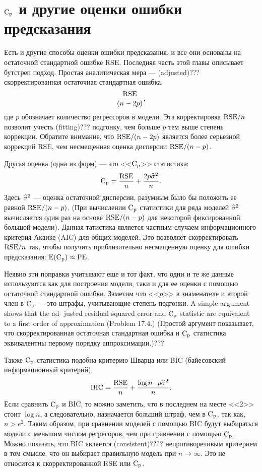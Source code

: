 \section{$\text{C}_{\text{p}}$ и другие оценки ошибки предсказания}
Есть и другие способы оценки ошибки предсказания, и все они основаны на остаточной стандартной ошибке RSE. Последняя часть этой главы описывает бутстреп подход. Простая аналитическая мера --- (adjusted)??? скорректированная остаточная стандартная ошибка:
\begin{equation}
\frac{\text{RSE}}{(n - 2p)},
\end{equation}
где $p$ обозначает количество регрессоров в модели. 
Эта корректировка $\text{RSE} / n$ позволит учесть (fitting)??? подгонку, чем больше $p$ тем выше степень коррекции. Обратите внимание, что $\text{RSE} / (n-2p)$ является более серьезной коррекций RSE, чем несмещенная оценка дисперсии $\text{RSE} / (n-p)$.

Другая оценка (одна из форм) --- это <<$\text{C}_{\text{p}}$>> статистика:
\begin{equation}
\text{C}_{\text{p}} = \frac{\text{RSE}}{n} + \frac{2p\widehat{\sigma}^{2}}{n}.
\end{equation}
Здесь $\widehat{\sigma}^{2}$ --- оценка остаточной дисперсии, разумным было бы положить ее равной $\text{RSE} / (n - p)$. (При вычислении $\text{C}_{\text{p}}$ статистики для ряда моделей $\widehat{\sigma}^{2}$ вычисляется один раз на основе $\text{RSE} / (n - p)$ для некоторой фиксированной большой модели). 
Данная татистика является частным случаем информационного критерия Акаике (AIC) для общих моделей. Это позволяет скорректировать $\text{RSE} / n$ так, чтобы получить приблизительно несмещенную оценку для ошибки предсказания: $\text{E}(\text{C}_{\text{p}}) \approx \text{PE}$.

Неявно эти поправки учитывают еще и тот факт, что одни и те же данные используются как для построения модели, таки и для ее оценки с помощью остаточной стандартной ошибки. Заметим что <<$p$>> в знаменателе и второй член в $\text{C}_{\text{p}}$ --- это штрафы, учитывающие степень подгонки. A simple argument shows that the ad- justed residual squared error and $\text{C}_{\text{p}}$ statistic are equivalent to a first order of approximation (Problem 17.4.) (Простой аргумент показывает, что скорректированная остаточная стандартная ошибка и $\text{C}_{\text{p}}$ статистика эквивалентны первому порядку аппроксимации.)???

Также $\text{C}_{\text{p}}$ статистика подобна критерию Шварца или BIC (байесовский информационный критерий).
\begin{equation}
\text{BIC} = \frac{\text{RSE}}{n} +\frac{ \log n \cdot p \widehat{\sigma}^{2}}{n}.
\end{equation}
Если сравнить $\text{C}_{\text{p}}$ и BIC, то можно заметить, что в последнем на месте <<2>> стоит $\log n$, а следовательно, назначается больший штраф, чем в $\text{C}_{\text{p}}$, так как, $n > e^{2}$. Таким образом, при сравнении моделей с помощью BIC будут выбираться модели с меньшим числом регресоров, чем при сравнении с помощью $\text{C}_{\text{p}}$. Можно показать, что BIC является (consistent)???? непротиворечивым критерием в том смысле, что он выбирает правильную модель при $n \rightarrow \infty $. Это не относится к скорректированной RSE или $\text{C}_{\text{p}}$.

